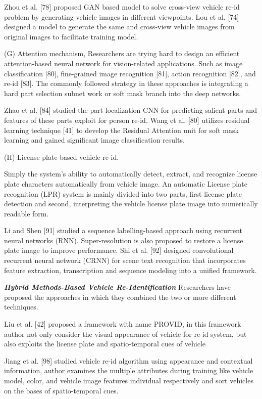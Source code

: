 	Zhou et al. [78] proposed GAN based model to solve cross-view vehicle re-id problem by
generating vehicle images in different viewpoints. Lou et al. [74] designed a model to
generate the same and cross-view vehicle images from original images to facilitate training model. 
	
(G) Attention mechanism, 
	Researchers are trying hard to design an efficient attention-based neural network for
vision-related applications. Such as image classification [80], fine-grained image recognition [81], action recognition [82], and re-id [83]. The commonly followed strategy in these
approaches is integrating a hard part selection subnet work or soft mask branch into the deep networks. 
	
	Zhao et al. [84] studied the part-localization CNN for predicting
	salient parts and features of these parts exploit for person re-id. Wang et al. [80] utilizes
residual learning technique [41] to develop the Residual Attention unit for soft mask learning and gained significant image classification results. 
	
(H) License plate-based vehicle re-id.

	Simply the system’s ability to automatically detect, extract, and recognize license plate characters automatically from vehicle image.
	An automatic License plate recognition (LPR) system is mainly divided into two parts, first license plate detection and
second, interpreting the vehicle license plate image into numerically readable form. 
	
	Li and Shen [91] studied a sequence labelling-based approach using recurrent neural networks (RNN). Super-resolution is also proposed to
	restore a license plate image to improve performance. Shi et al. [92] designed convolutional recurrent neural network (CRNN) for scene text recognition that incorporates feature
extraction, transcription and sequence modeling into a unified framework. 



\textit{\textbf{Hybrid Methods-Based Vehicle Re-Identification
}}
Researchers
have proposed the approaches in which they combined the two or more different techniques.

Liu et al. [42] proposed a framework with name PROVID, in this
framework author not only consider the visual appearance of vehicle for re-id system, but
also exploits the license plate and spatio-temporal cues of vehicle 

Jiang et al. [98] studied vehicle re-id algorithm using appearance and contextual information, author examines the multiple attributes during training like vehicle model, color, and
vehicle image features individual respectively and sort vehicles on the bases of spatio-temporal cues. 

